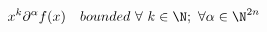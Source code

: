 \begin{equation}
	x^{k}\partial^{\alpha}f(x)~~~bounded~\forall~k\in\N;~\forall \alpha\in \N^{2n}
\end{equation}

